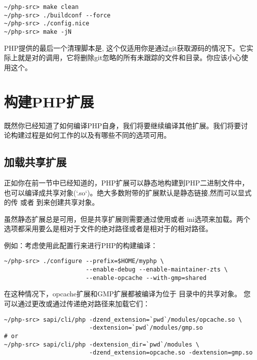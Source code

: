 \begin{lstlisting}[language=shell]
~/php-src> make clean
~/php-src> ./buildconf --force
~/php-src> ./config.nice
~/php-src> make -jN
\end{lstlisting}

PHP提供的最后一个清理脚本是, 这个仅适用你是通过git获取源码的情况下。它实际上就是对的调用，它将删除git忽略的所有未跟踪的文件和目录。你应该小心使用这个。

\section{构建PHP扩展}

既然你已经知道了如何编译PHP自身，我们将要继续编译其他扩展。我们将要讨论构建过程是如何工作的以及有哪些不同的选项可用。

\subsection{加载共享扩展}

正如你在前一节中已经知道的，PHP扩展可以静态地构建到PHP二进制文件中，也可以编译成共享对象(`.so`)。绝大多数附带的扩展默认是静态链接,然而可以显式的传 或者 到来创建共享对象。

虽然静态扩展总是可用，但是共享扩展则需要通过使用或者 ini选项来加载。两个选项都采用要么是相对于文件的绝对路径或者是相对于的相对路径。

例如：考虑使用此配置行来进行PHP的构建编译：

\begin{lstlisting}[language=shell]
~/php-src> ./configure --prefix=$HOME/myphp \
                       --enable-debug --enable-maintainer-zts \
                       --enable-opcache --with-gmp=shared
\end{lstlisting}                   
                     

在这种情况下，opcache扩展和GMP扩展都被编译为位于 目录中的共享对象。 您可以通过更改或通过传递绝对路径来加载它们：

\begin{lstlisting}[language=shell]
~/php-src> sapi/cli/php -dzend_extension=`pwd`/modules/opcache.so \
                        -dextension=`pwd`/modules/gmp.so
# or
~/php-src> sapi/cli/php -dextension_dir=`pwd`/modules \
                        -dzend_extension=opcache.so -dextension=gmp.so
\end{lstlisting} 


